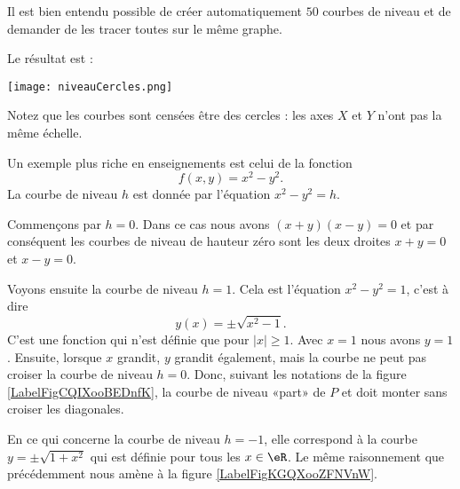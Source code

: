 Il est bien entendu possible de créer automatiquement $50$ courbes de niveau et de demander de les tracer toutes sur le même graphe.


Le résultat est :

\begin{center}
        \texttt{[image: niveauCercles.png]}
\end{center}
Notez que les courbes sont censées être des cercles : les axes $X$ et $Y$ n'ont pas la même échelle. 


\begin{example}
    Un exemple plus riche en enseignements est celui de la fonction
    \begin{equation}
        f(x,y)=x^2-y^2.
    \end{equation}
    La courbe de niveau $h$ est donnée par l'équation $x^2-y^2=h$.

    Commençons par $h=0$. Dans ce cas nous avons $(x+y)(x-y)=0$ et par conséquent les courbes de niveau de hauteur zéro sont les deux droites $x+y=0$ et $x-y=0$.

    Voyons ensuite la courbe de niveau $h=1$. Cela est l'équation $x^2-y^2=1$, c'est à dire
    \begin{equation}
        y(x)=\pm\sqrt{x^2-1}.
    \end{equation}
    C'est une fonction qui n'est définie que pour $| x |\geq 1$. Avec $x=1$ nous avons $y=1$. Ensuite, lorsque $x$ grandit, $y$ grandit également, mais la courbe ne peut pas croiser la courbe de niveau $h=0$. Donc, suivant les notations de la figure \ref{LabelFigCQIXooBEDnfK}, la courbe de niveau «part» de $P$ et doit monter sans croiser les diagonales.


\newcommand{\CaptionFigCQIXooBEDnfK}{La courbe de niveau $h=1$ de $x^2-y^2$. Notez qu'elle est en deux morceaux.}


\newcommand{\CaptionFigKGQXooZFNVnW}{La courbe de niveau $x^2-y^2=-1$.}


    En ce qui concerne la courbe de niveau $h=-1$, elle correspond à la courbe $y=\pm\sqrt{1+x^2}$ qui est définie pour tous les $x\in\eR$. Le même raisonnement que précédemment nous amène à la figure \ref{LabelFigKGQXooZFNVnW}.

\end{example}

